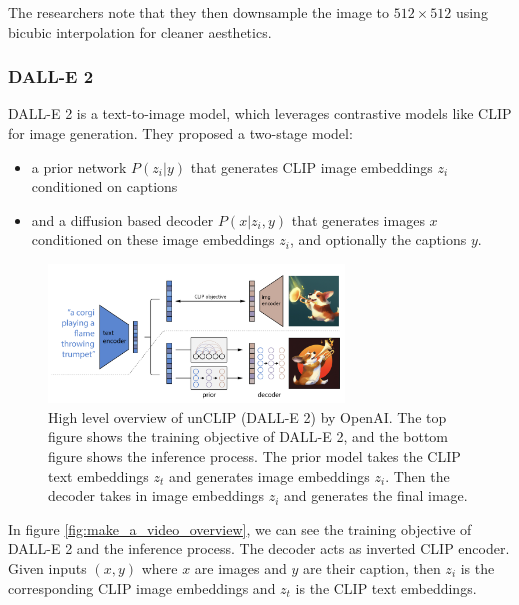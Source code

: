 The researchers note that they then downsample the image to $512\times 512$ using bicubic interpolation for cleaner aesthetics.







\subsubsection{DALL-E 2}
\label{sec:dalle_2}

DALL-E 2 is a text-to-image model, which leverages contrastive models like CLIP for image generation. They proposed a two-stage model: 

\begin{itemize}
    \item a prior network $P(z_i | y)$ that generates CLIP image embeddings $z_i$ conditioned on captions
    \item and a diffusion based decoder $P(x | z_i, y)$ that generates images $x$ conditioned on these image embeddings $z_i$, and optionally the captions $y$.
\end{itemize}

\begin{figure}
    \centering
    \includegraphics[width=0.7\textwidth]{images/make_a_video/dalle_2.png}
    \caption{High level overview of unCLIP (DALL-E 2) \cite{dalle_2} by OpenAI. The top figure shows the training objective of DALL-E 2, and the bottom figure shows the inference process. The prior model takes the CLIP text embeddings $z_t$ and generates image embeddings $z_i$. Then the decoder takes in image embeddings $z_i$ and generates the final image.}
    \label{fig:make_a_video_dalle2_overview}
\end{figure}

In figure \ref{fig:make_a_video_overview}, we can see the training objective of DALL-E 2 and the inference process. The decoder acts as inverted CLIP encoder. Given inputs $(x, y)$ where $x$ are images and $y$ are their caption, then $z_i$ is the corresponding CLIP image embeddings and $z_t$ is the CLIP text embeddings.

